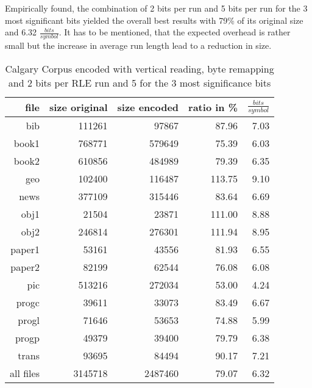 \par{
Empirically found, the combination of 2 bits per run and 5 bits per run for the 3 most significant bits yielded the overall best results with 79\% of its original size and 6.32 $\frac{bits}{symbol}$. It has to be mentioned, that the expected overhead is rather small but the increase in average run length lead to a reduction in size.
\begin{table}[H]
	\centering
	\begin{tabular}{r|r|r|r|r}	
		file & size original & size encoded & ratio in \% & $\frac{bits}{symbol}$\\
		\hline
		bib & 111261 & 97867 & 87.96 & 7.03\\
		book1 & 768771 & 579649 & 75.39 & 6.03 \\
		book2 & 610856 & 484989 & 79.39 & 6.35\\
		geo & 102400 & 116487 & 113.75 & 9.10\\
		news & 377109 & 315446 & 83.64 & 6.69\\
		obj1 & 21504 & 23871 & 111.00 & 8.88\\
		obj2& 246814 & 276301 & 111.94 & 8.95\\		 
		paper1 & 53161 & 43556 & 81.93 & 6.55\\		 
		paper2& 82199 & 62544 & 76.08 & 6.08\\		 
		pic & 513216 & 272034 & 53.00 & 4.24\\		 
		progc & 39611 & 33073 & 83.49 & 6.67\\		 
		progl & 71646 & 53653 & 74.88 & 5.99\\		 
		progp & 49379 & 39400 & 79.79 & 6.38\\		 
		trans & 93695 & 84494 & 90.17 & 7.21\\
		\hline
		all files & 3145718 & 2487460 & 79.07 & 6.32
	\end{tabular}
	\caption{Calgary Corpus encoded with vertical reading, byte remapping and 2 bits per RLE run and 5 for the 3 most significance bits}
\label{tab:t43 Calgary Corpus encoded with vertical reading, byte remapping and 2 bits per RLE run and 5 for the 3 most significance bits}
\end{table}
}

